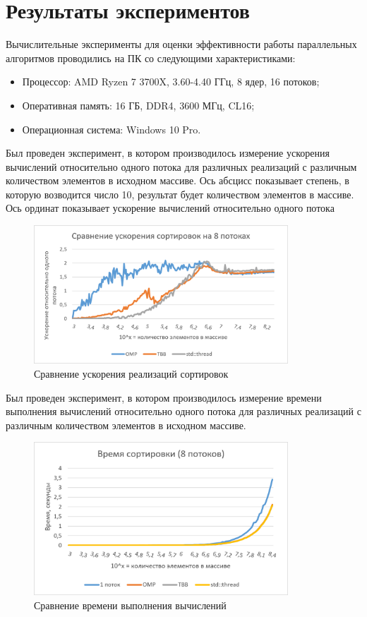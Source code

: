 \documentclass{report}
\begin{document}
\section*{Результаты экспериментов}
Вычислительные эксперименты для оценки эффективности работы параллельных алгоритмов проводились на ПК со следующими характеристиками:
\begin{itemize}
    \item Процессор: AMD Ryzen 7 3700X, 3.60-4.40 ГГц, 8 ядер, 16 потоков;
    \item Оперативная память: 16 ГБ, DDR4, 3600 МГц, CL16;
    \item Операционная система: Windows 10 Pro.
\end{itemize}
\par Был проведен эксперимент, в котором производилось измерение ускорения вычислений относительно одного потока для различных реализаций с различным количеством элементов в исходном массиве. Ось абсцисс показывает степень, в которую возводится число 10, результат будет количеством элементов в массиве. Ось ординат показывает ускорение вычислений относительно одного потока
\begin{figure}[H]
    \centering
    \includegraphics[width=0.85\textwidth]{boost_comparsion_8thrd.png}
    \caption{Сравнение ускорения реализаций сортировок}
    \label{fig:my_label_1}
\end{figure}
\par Был проведен эксперимент, в котором производилось измерение времени выполнения вычислений относительно одного потока для различных реализаций с различным количеством элементов в исходном массиве.
\begin{figure}[H]
    \centering
    \includegraphics[width=0.85\textwidth]{sort_time_8thrd.png}
    \caption{Сравнение времени выполнения вычислений}
    \label{fig:my_label_2}
\end{figure}
\end{document}
